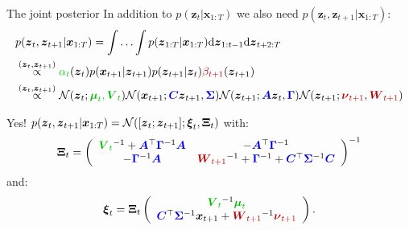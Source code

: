 \documentclass{beamer}
\newcommand{\myarray}[2]{\left(\begin{array}{#1}#2\end{array}\right)}
\newcommand{\bs}[1]{\boldsymbol{#1}}
\newcommand{\paint}[2]{{\color{#1}#2}}
\begin{document}
\begin{frame}{The joint posterior}
 In addition to $p(\bs{z}_t|\bs{x}_{1:T})$ we also need $p(\bs{z}_t,\bs{z}_{t+1}|\bs{x}_{1:T})$:
 \footnotesize
 \begin{align*}
 &p(\bs{z}_t,\bs{z}_{t+1}|\bs{x}_{1:T}) = \int\ldots\int p(\bs{z}_{1:T}|\bs{x}_{1:T})\textrm{d}\bs{z}_{1:t-1}\textrm{d}\bs{z}_{t+2:T} \\
 &\stackrel{(\bs{z}_t,\bs{z}_{t+1})}{\propto} \paint{mygreen}{\alpha_t}(\bs{z}_t)p(\bs{x}_{t+1}|\bs{z}_{t+1})p(\bs{z}_{t+1}|\bs{z}_t)\paint{myred}{\beta_{t+1}}(\bs{z}_{t+1})\\
 &\stackrel{(\bs{z}_t,\bs{z}_{t+1})}{\propto} {\cal N}(\bs{z}_t;\paint{mygreen}{\boldsymbol{\mu}_t,\bs{V}_t}) {\cal N}(\bs{x}_{t+1};\paint{myblue}{\bs{C}}\bs{z}_{t+1},\paint{myblue}{\bs{\Sigma}}) {\cal N}(\bs{z}_{t+1};\paint{myblue}{\bs{A}}\bs{z}_t,\paint{myblue}{\bs{\Gamma}}) {\cal N}(\bs{z}_{t+1};\paint{myred}{\boldsymbol{\nu}_{t+1}},\paint{myred}{\bs{W}_{t+1}})
\end{align*}
\normalsize
{}\vspace{3mm}
\pause

Yes! $p(\bs{z}_t,\bs{z}_{t+1}|\bs{x}_{1:T}) = {\cal N}([\bs{z}_{t};\bs{z}_{t+1}]; \bs{\xi}_t,\bs{\Xi}_t)$ with:
{ \footnotesize
\begin{equation*}
 \bs{\Xi}_t = \myarray{cc}{\paint{mygreen}{\bs{V}_t}^{-1}+\paint{myblue}{\bs{A}}^\top\paint{myblue}{\bs{\Gamma}}^{-1}\paint{myblue}{\bs{A}} & -\paint{myblue}{\bs{A}}^\top\paint{myblue}{\bs{\Gamma}}^{-1}\\-\paint{myblue}{\bs{\Gamma}}^{-1}\paint{myblue}{\bs{A}} & \paint{myred}{\bs{W}_{t+1}}^{-1} + \paint{myblue}{\bs{\Gamma}}^{-1} + \paint{myblue}{\bs{C}}^\top\paint{myblue}{\bs{\Sigma}}^{-1}\paint{myblue}{\bs{C}}}^{-1}
\end{equation*}}
and:
{ \footnotesize\begin{equation*}
 \bs{\xi}_t = \bs{\Xi}_t\myarray{c}{\paint{mygreen}{\bs{V}_t}^{-1}\paint{mygreen}{\boldsymbol{\mu}_t}\\\paint{myblue}{\bs{C}}^\top\paint{myblue}{\bs{\Sigma}}^{-1}\bs{x}_{t+1} + \paint{myred}{\bs{W}_{t+1}}^{-1}\paint{myred}{\boldsymbol{\nu}_{t+1}}}.
 \end{equation*}}
\end{frame}
\end{document}
